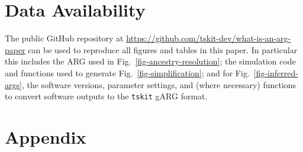 \documentclass{article}
\begin{document}
\section*{Data Availability}
The public GitHub repository at
\url{https://github.com/tskit-dev/what-is-an-arg-paper} can be
used to reproduce all figures and tables in this paper.
In particular this includes
the ARG used in Fig.~\ref{fig-ancestry-resolution};
the simulation code and functions
used to generate Fig.~\ref{fig-simplification};
and for Fig.~\ref{fig-inferred-args},
the software versions, parameter settings, and
(where necessary) functions to convert
software outputs to the \texttt{tskit} gARG format.




\setcounter{secnumdepth}{2} %

\section*{Appendix}
\appendix

\setcounter{table}{0}
\setcounter{figure}{0}
\renewcommand{\thetable}{A\arabic{table}}
\renewcommand{\thefigure}{A\arabic{figure}}
\end{document}
